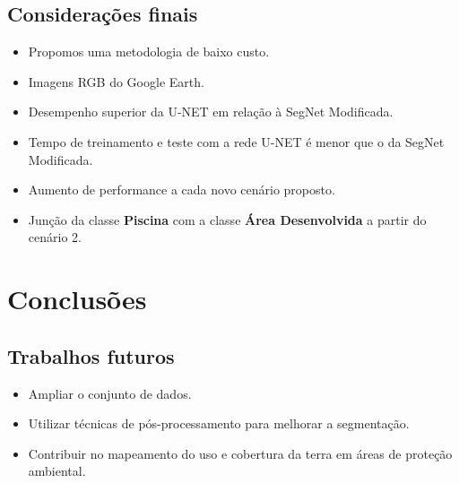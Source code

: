 \documentclass[%
  10pt,%
  aspectratio = 169,%
  compress,%
  t,%
  english,%
  brazilian,%
  tikz,
]{beamer}
\begin{document}
\subsection{Considerações finais}\label{ssec:concl1}

\begin{frame}
\begin{itemize}
    \item Propomos uma metodologia de baixo custo.
    \item Imagens RGB do Google Earth.
    \item Desempenho superior da U-NET em relação à SegNet Modificada.
    \item Tempo de treinamento e teste com a rede U-NET é menor que o da SegNet Modificada.
    \item Aumento de performance a cada novo cenário proposto.
    \item Junção da classe \textbf{Piscina} com a classe \textbf{Área Desenvolvida} a partir do cenário 2.
\end{itemize}
\end{frame}

\section{Conclusões}\label{sec:concl}

\subsection{Trabalhos futuros}\label{ssec:concl1}

\begin{frame}
\begin{itemize}
    \item Ampliar o conjunto de dados.
    \item Utilizar técnicas de pós-processamento para melhorar a segmentação.
    \item Contribuir no mapeamento do uso e cobertura da terra em áreas de proteção ambiental.
\end{itemize}
\end{frame}

\end{document}

